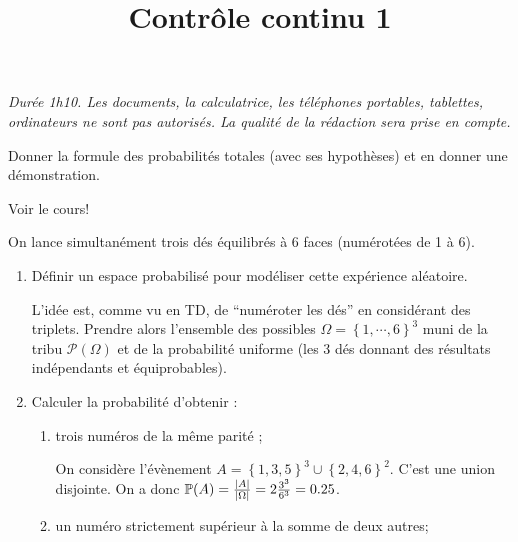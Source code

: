 \documentclass[a4paper]{tp_um}
\title{\large \sffamily\bfseries Contrôle continu 1}
\begin{document}
\maketitle
\textit{Durée 1h10. Les documents, la calculatrice, les téléphones portables, tablettes, ordinateurs ne sont pas autorisés. La qualité de la rédaction sera prise en compte.} 

\bigskip
\bigskip

 Donner la formule des probabilités totales (avec ses hypothèses) et en donner une démonstration.

\bigskip
Voir le cours!
\bigskip

\exo{} On lance simultanément trois dés équilibrés à 6 faces (numérotées de 1 à 6).
\begin{enumerate}
    \item Définir un espace probabilisé pour modéliser cette expérience aléatoire.

        \bigskip
        L'idée est, comme vu en TD, de ``numéroter les dés'' en considérant des triplets. Prendre alors l'ensemble des possibles $\Omega = \left\{ 1,\cdots,6 \right\}^3$ muni de la tribu $\mathcal P (\Omega)$ et de la probabilité uniforme (les 3 dés donnant des résultats indépendants et équiprobables).

        \bigskip

    \item Calculer la probabilité d'obtenir :


        \begin{enumerate}
            \item trois numéros de la même parité ;

                \bigskip
                On considère l'évènement $A  = \left\{ 1,3,5 \right\}^3 \cup \left\{ 2,4,6 \right\}^2$. C'est une union disjointe. On a donc $\P(A) = \frac{|A|}{|\Omega|} = 2\frac{3^3}{6^3} = 0.25$. 
                \bigskip
            \item un numéro strictement supérieur à la somme de deux autres;


\end{enumerate}
\end{enumerate}
\end{document}
